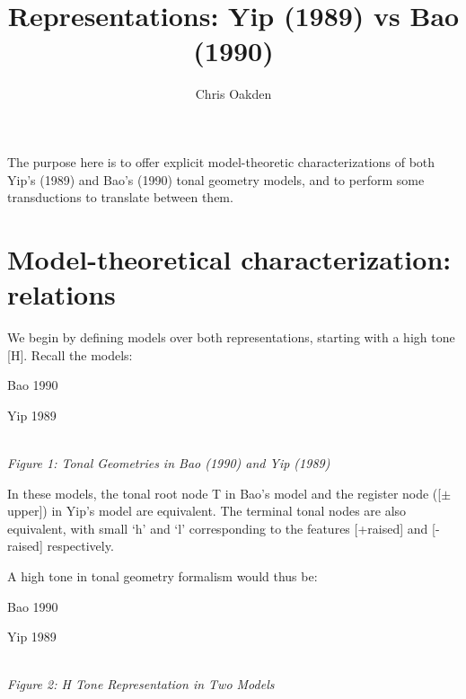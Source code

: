 \documentclass{article}
\title{Representations: Yip (1989) vs Bao (1990)}
\author{Chris Oakden}
\begin{document}
\maketitle
The purpose here is to offer explicit model-theoretic characterizations of both Yip's (1989) and Bao's (1990) tonal geometry models, and to perform some transductions to translate between them.
\section{Model-theoretical characterization: relations}
We begin by defining models over both representations, starting with a high tone [H]. Recall the models: \\
\begin{center}
Bao 1990
\hspace{1cm}
Yip 1989
 \\ \smallskip{}
\textit{Figure 1: Tonal Geometries in Bao (1990) and Yip (1989)}
\end{center}
In these models, the tonal root node T in Bao's model and the register node ([$\pm$upper]) in Yip's model are equivalent. The terminal tonal nodes are also equivalent, with small `h' and `l' corresponding to the features [+raised] and [-raised] respectively.\par
A high tone in tonal geometry formalism would thus be: \\
\begin{center}
 Bao 1990
\hspace{1cm}
Yip 1989
 \\ \smallskip{}
\textit{Figure 2: H Tone Representation in Two Models}
\end{center}
\end{document}
